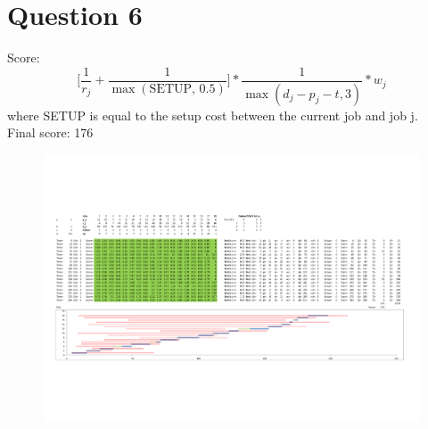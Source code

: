 \documentclass[10pt,a4paper]{article}
\begin{document}
\section*{Question 6}
Score:
\begin{equation*}
	\bigg[\frac{1}{r_j} + \frac{1}{\max(\text{SETUP, }0.5)}\bigg] * \frac{1}{\max(d_j-p_j-t, 3)} * w_j
\end{equation*}
where SETUP is equal to the setup cost between the current job and job j.\\
Final score: 176
\newpage
\thispagestyle{empty}
\begin{figure}
	\centering
	\includegraphics[height=0.8\textheight, angle=90, origin=c]{q6}
\end{figure}
\end{document}
